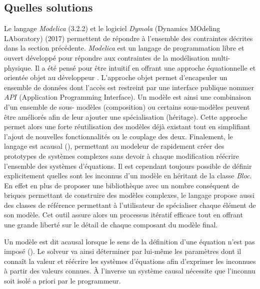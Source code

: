 \subsection{Quelles solutions} %
\label{sub:quelles_solutions}
Le langage \textit{Modelica} (3.2.2) et le logiciel \textit{Dymola} (Dynamics MOdeling
LAboratory) (2017) permettent de répondre à l’ensemble des contraintes décrites dans la
section précédente. \textit{Modelica} est un langage de programmation libre et ouvert
développé pour répondre aux contraintes de la modélisation multi-physique. Il a été pensé
pour être intuitif en offrant une approche équationnelle et orientée objet au développeur
\parencite{Wetter2016290}.
L’approche objet permet d’encapsuler un ensemble de données dont l’accès est restreint par
une interface publique nommer $API$ (Application Programming Interface). Un modèle est
ainsi une combinaison d’un ensemble de sous- modèles (composition) ou certains sous-modèles
peuvent être améliorés afin de leur ajouter une spécialisation (héritage). Cette
approche permet alors une forte réutilisation des modèles déjà existant tout en
simplifiant l’ajout de nouvelles fonctionnalités ou le couplage des deux. Finalement, le
langage est acausal (), permettant au modeleur de rapidement
créer des prototypes de systèmes complexes sans devoir à chaque modification réécrire
l’ensemble des systèmes d’équations. Il est cependant toujours possible de définir
explicitement quelles sont les inconnus d’un modèle en héritant de la classe \textit{Bloc}.
En effet en plus de proposer une bibliothèque avec un nombre conséquent de briques
permettant de construire des modèles complexes, le langage propose aussi des classes de
référence permettant à l’utilisateur de spécialiser chaque élément de son modèle. Cet
outil assure alors un processus itératif efficace tout en offrant une grande liberté sur
le détail de chaque composant du modèle final.


\begin{Def}[Acausal]\label{def:acausal}
Un modèle est dit acausal lorsque le sens de la définition d’une équation n’est pas
imposé (). Le solveur va ainsi déterminer par lui-même les
paramètres dont il connaît la valeur et réécrire les systèmes d’équations afin d’exprimer
les inconnues à partir des valeurs connues. À l’inverse un système causal nécessite
que l’inconnu soit isolé a priori par le programmeur.
\end{Def}

